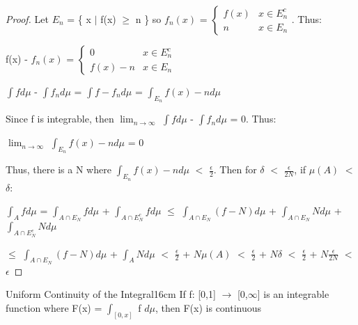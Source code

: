     \begin{proof}
        Let $E_n$ = \{ x $|$ f(x) $\geq$ n \}
        so $f_n(x)$
        = $\begin{cases}
            f(x) & x \in E_n^c \\
            n & x \in E_n
        \end{cases}$.
        Thus:
        
        \hspace{0.5cm}
        f(x) - $f_n(x)$
        = $\begin{cases}
            0 & x \in E_n^c \\
            f(x) - n & x \in E_n
        \end{cases}$

        \hspace{0.5cm}
        $\int f d\mu$ - $\int f_n d\mu$
        = $\int f-f_n d\mu$
        = $\int_{E_n} f(x)-n d\mu$

        Since f is integrable, then
        $\lim_{n \rightarrow \infty}$ $\int f d\mu$ - $\int f_n d\mu$ = 0. Thus:

        \hspace{0.5cm}
        $\lim_{n \rightarrow \infty}$ $\int_{E_n} f(x)-n d\mu$ = 0

        Thus, there is a N where
        $\int_{E_n} f(x)-n d\mu$ $<$ $\frac{\epsilon}{2}$.
        Then for $\delta$ $<$ $\frac{\epsilon}{2N}$, if $\mu(A)$ $<$ $\delta$:

        \hspace{0.5cm}
        $\int_A f d\mu$
        = $\int_{A \cap E_N} f d\mu$ + $\int_{A \cap E_N^c} f d\mu$
        $\leq$ $\int_{A \cap E_N} (f-N) d\mu$
                + $\int_{A \cap E_N} N d\mu$
                + $\int_{A \cap E_N^c} N d\mu$

        \hspace{1.9cm}
        $\leq$ $\int_{A \cap E_N} (f-N) d\mu$
                + $\int_A N d\mu$
        $<$ $\frac{\epsilon}{2}$ + $N\mu(A)$
        $<$ $\frac{\epsilon}{2}$ + $N\delta$
        $<$ $\frac{\epsilon}{2}$ + $N\frac{\epsilon}{2N}$
        $<$ $\epsilon$
    \end{proof}

    \vspace{0.5cm}



    \begin{corollary}{Uniform Continuity of the Integral}{16cm}
        If f: [0,1] $\rightarrow$ [0,$\infty$] is an integrable
        function where F(x) = $\int_{[0,x]}$ f $d\mu$, then F(x) is continuous
    \end{corollary}

